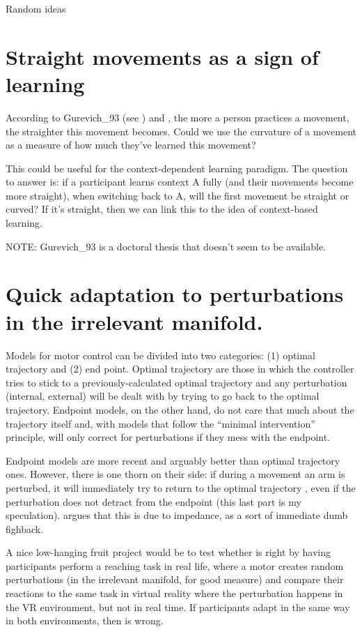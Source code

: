 \documentclass{report}
\begin{document}
\begin{chapter}{Random ideas}
\section{Straight movements as a sign of learning}
According to Gurevich\_93 (see \cite{Wolpert_Are_1995}) and
\cite{Shadmehr_Adaptive_1994}, the more a person practices a movement, the
straighter this movement becomes. Could we use the curvature of a movement as a
measure of how much they've learned this movement?

This could be useful for the context-dependent learning paradigm. The question
to answer is: if a participant learns context A fully (and their movements
become more straight), when switching back to A, will the first movement be
straight or curved? If it's straight, then we can link this to the idea of
context-based learning.

NOTE: Gurevich\_93 is a doctoral thesis that doesn't seem to be available.


\section{Quick adaptation to perturbations in the irrelevant manifold.}
Models for motor control can be divided into two categories: (1) optimal
trajectory and (2) end point. Optimal trajectory are those in which the
controller tries to stick to a previously-calculated optimal trajectory and any
perturbation (internal, external) will be dealt with by trying to go back to the
optimal trajectory. Endpoint models, on the other hand, do not care that much
about the trajectory itself and, with models that follow the ``minimal
intervention'' principle, will only correct for perturbations if they mess with
the endpoint.

Endpoint models are more recent and arguably better than optimal trajectory
ones. However, there is one thorn on their side: if during a movement an arm is
perturbed, it will immediately try to return to the optimal trajectory
\citep{Bizzi_Posture_1984}, even if the perturbation does not detract from the
endpoint (this last part is my speculation). \cite{Todorov_Optimality_2004}
argues that this is due to impedance, as a sort of immediate dumb fighback.

A nice low-hanging fruit project would be to test whether
\cite{Todorov_Optimality_2004} is right by having participants perform a
reaching task in real life, where a motor creates random perturbations (in the
irrelevant manifold, for good measure) and compare their reactions to the same
task in virtual reality where the perturbation happens in the VR environment,
but not in real time. If participants adapt in the same way in both
environments, then \cite{Todorov_Optimality_2004} is wrong.

\end{chapter}
\end{document}
